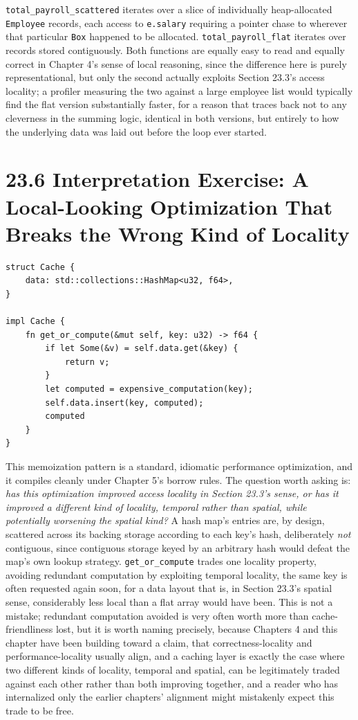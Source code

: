 \documentclass[11pt]{book}
\begin{document}
\texttt{total\_payroll\_scattered} iterates over a slice of individually heap-allocated \texttt{Employee} records, each access to \texttt{e.salary} requiring a pointer chase to wherever that particular \texttt{Box} happened to be allocated. \texttt{total\_payroll\_flat} iterates over records stored contiguously. Both functions are equally easy to read and equally correct in Chapter 4's sense of local reasoning, since the difference here is purely representational, but only the second actually exploits Section 23.3's access locality; a profiler measuring the two against a large employee list would typically find the flat version substantially faster, for a reason that traces back not to any cleverness in the summing logic, identical in both versions, but entirely to how the underlying data was laid out before the loop ever started.

\section*{23.6 Interpretation Exercise: A Local-Looking Optimization That Breaks the Wrong Kind of Locality}

\begin{lstlisting}
struct Cache {
    data: std::collections::HashMap<u32, f64>,
}

impl Cache {
    fn get_or_compute(&mut self, key: u32) -> f64 {
        if let Some(&v) = self.data.get(&key) {
            return v;
        }
        let computed = expensive_computation(key);
        self.data.insert(key, computed);
        computed
    }
}
\end{lstlisting}

This memoization pattern is a standard, idiomatic performance optimization, and it compiles cleanly under Chapter 5's borrow rules. The question worth asking is: \emph{has this optimization improved access locality in Section 23.3's sense, or has it improved a different kind of locality, temporal rather than spatial, while potentially worsening the spatial kind?} A hash map's entries are, by design, scattered across its backing storage according to each key's hash, deliberately \emph{not} contiguous, since contiguous storage keyed by an arbitrary hash would defeat the map's own lookup strategy. \texttt{get\_or\_compute} trades one locality property, avoiding redundant computation by exploiting temporal locality, the same key is often requested again soon, for a data layout that is, in Section 23.3's spatial sense, considerably less local than a flat array would have been. This is not a mistake; redundant computation avoided is very often worth more than cache-friendliness lost, but it is worth naming precisely, because Chapters 4 and this chapter have been building toward a claim, that correctness-locality and performance-locality usually align, and a caching layer is exactly the case where two different kinds of locality, temporal and spatial, can be legitimately traded against each other rather than both improving together, and a reader who has internalized only the earlier chapters' alignment might mistakenly expect this trade to be free.
\end{document}
